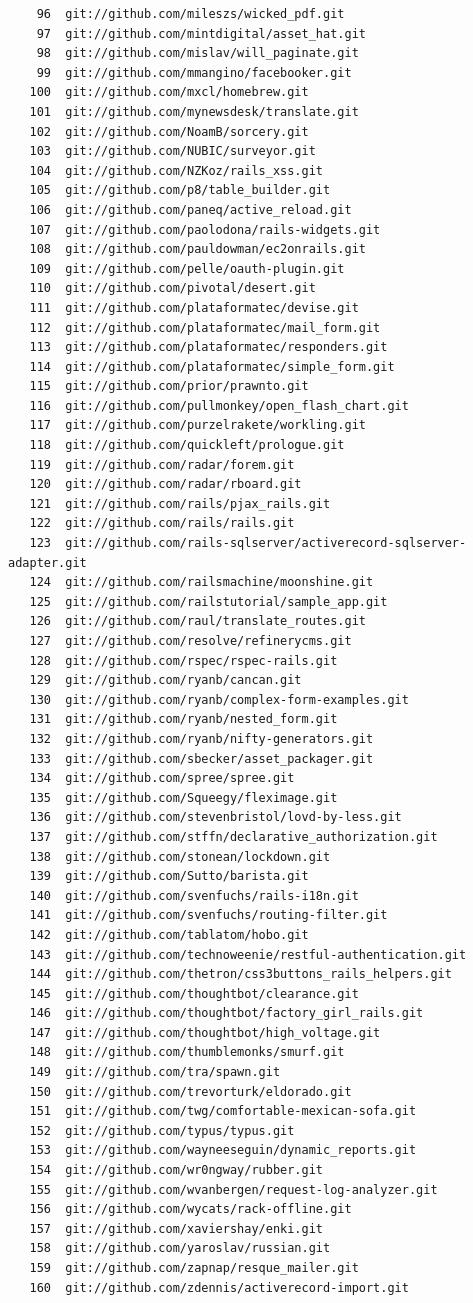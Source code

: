 \documentclass{cs-thesis}
\begin{document}
\begin{verbatim}
    96	git://github.com/mileszs/wicked_pdf.git
    97	git://github.com/mintdigital/asset_hat.git
    98	git://github.com/mislav/will_paginate.git
    99	git://github.com/mmangino/facebooker.git
   100	git://github.com/mxcl/homebrew.git
   101	git://github.com/mynewsdesk/translate.git
   102	git://github.com/NoamB/sorcery.git
   103	git://github.com/NUBIC/surveyor.git
   104	git://github.com/NZKoz/rails_xss.git
   105	git://github.com/p8/table_builder.git
   106	git://github.com/paneq/active_reload.git
   107	git://github.com/paolodona/rails-widgets.git
   108	git://github.com/pauldowman/ec2onrails.git
   109	git://github.com/pelle/oauth-plugin.git
   110	git://github.com/pivotal/desert.git
   111	git://github.com/plataformatec/devise.git
   112	git://github.com/plataformatec/mail_form.git
   113	git://github.com/plataformatec/responders.git
   114	git://github.com/plataformatec/simple_form.git
   115	git://github.com/prior/prawnto.git
   116	git://github.com/pullmonkey/open_flash_chart.git
   117	git://github.com/purzelrakete/workling.git
   118	git://github.com/quickleft/prologue.git
   119	git://github.com/radar/forem.git
   120	git://github.com/radar/rboard.git
   121	git://github.com/rails/pjax_rails.git
   122	git://github.com/rails/rails.git
   123	git://github.com/rails-sqlserver/activerecord-sqlserver-adapter.git
   124	git://github.com/railsmachine/moonshine.git
   125	git://github.com/railstutorial/sample_app.git
   126	git://github.com/raul/translate_routes.git
   127	git://github.com/resolve/refinerycms.git
   128	git://github.com/rspec/rspec-rails.git
   129	git://github.com/ryanb/cancan.git
   130	git://github.com/ryanb/complex-form-examples.git
   131	git://github.com/ryanb/nested_form.git
   132	git://github.com/ryanb/nifty-generators.git
   133	git://github.com/sbecker/asset_packager.git
   134	git://github.com/spree/spree.git
   135	git://github.com/Squeegy/fleximage.git
   136	git://github.com/stevenbristol/lovd-by-less.git
   137	git://github.com/stffn/declarative_authorization.git
   138	git://github.com/stonean/lockdown.git
   139	git://github.com/Sutto/barista.git
   140	git://github.com/svenfuchs/rails-i18n.git
   141	git://github.com/svenfuchs/routing-filter.git
   142	git://github.com/tablatom/hobo.git
   143	git://github.com/technoweenie/restful-authentication.git
   144	git://github.com/thetron/css3buttons_rails_helpers.git
   145	git://github.com/thoughtbot/clearance.git
   146	git://github.com/thoughtbot/factory_girl_rails.git
   147	git://github.com/thoughtbot/high_voltage.git
   148	git://github.com/thumblemonks/smurf.git
   149	git://github.com/tra/spawn.git
   150	git://github.com/trevorturk/eldorado.git
   151	git://github.com/twg/comfortable-mexican-sofa.git
   152	git://github.com/typus/typus.git
   153	git://github.com/wayneeseguin/dynamic_reports.git
   154	git://github.com/wr0ngway/rubber.git
   155	git://github.com/wvanbergen/request-log-analyzer.git
   156	git://github.com/wycats/rack-offline.git
   157	git://github.com/xaviershay/enki.git
   158	git://github.com/yaroslav/russian.git
   159	git://github.com/zapnap/resque_mailer.git
   160	git://github.com/zdennis/activerecord-import.git
\end{verbatim}
\end{document}
